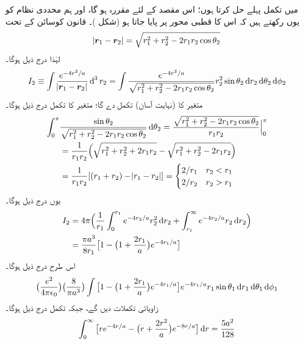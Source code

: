 میں  تکمل پہلے حل کرتا ہوں؛ اس مقصد کے لئے  مقررہ ہو گا، اور ہم  محددی نظام کو یوں رکھتے ہیں کہ اس کا قطبی محور  پر پایا جاتا ہو (شکل )۔ قانون کوسائن کے تحت 
\begin{align}
\abs{{{\boldsymbol{r}}}_{1}-{{\boldsymbol{r}}}_{2}}=\sqrt{r_{1}^{2}+r_{2}^{2}-2r_{1}r_{2}\cos{\theta_{2}}} 
\end{align}
 لہٰذا درج ذیل ہوگا۔
\begin{align}
I_{2}\equiv\int\frac{e^{-4r^{2}/a}}{\abs{\kvec{r}_{1}-\kvec{r}_{2}}}\dif^{\,3}r_{2}=\int\frac{e^{-4r^{2}/a}}{\sqrt{r_{1}^{2}+r_{2}^{2}-2r_{1}r_{2}\cos{\theta_{2}}}}r_{2}^{2}\sin{\theta_{2}}\dif r_{2}\dif \theta_{2}\dif \phi_{2} 
\end{align}
 متغیر  کا (نہایت آسان) تکمل  دے گا؛ متغیر  کا تکمل درج ذیل ہوگا۔
\begin{align}
 \int_{0}^{\pi}&\frac{\sin{\theta_{2}}}{\sqrt{r_{1}^{2}+r_{2}^{2}-2r_{1}r_{2}\cos{\theta_{2}}}}\dif{\theta_{2}}=\frac{\sqrt{r_{1}^{2}+r_{2}^{2}-2r_{1}r_{2}\cos{\theta_{2}}}}{r_{1}r_{2}}\Big\vert_{0}^{\pi}\nonumber\\
 &=\frac{1}{r_{1}r_{2}}\Big(\sqrt{r_{1}^{2}+r_{2}^{2}+2r_{1}r_{2}}-\sqrt{r_{1}^{2}+r_{2}^{2}-2r_{1}r_{2}}\Big)\nonumber\\
&=\frac{1}{r_{1}r_{2}}[(r_{1}+r_{2})-\abs{r_{1}-r_{2}}]=\begin{cases} 2/r_{1} & r_{2}<r_{1}\\
2/r_{2}&r_{2}>r_{1}
\end{cases}
\end{align}
 یوں درج ذیل ہوگا۔
\begin{align} 
I_{2}&=4\pi\Big (\frac{1}{r_{1}}\int_{0}^{r_{1}}e^{-4r_{2}/a}r_{2}^{2}\dif r_{2}+\int_{r_{1}}^{\infty}e^{-4r_{2}/a}r_{2}\dif r_{2}\Big)\nonumber\\
&=\frac{\pi a^{3}}{8r_{1}}\big[1-\big(1+\frac{2r_{1}}{a}\big)e^{-4r_{1}/a}\big]
\end{align}
 اس طرح  درج ذیل ہوگا۔
\begin{align*}
\big(\frac{e^{2}}{4\pi\epsilon_{0}}\big)\big(\frac{8}{\pi a^{3}}\big )\int\big [1-\big (1+\frac{2r_{1}}{a}\big )e^{-4r_{1}/a}\big ]e^{-4r_{1}/a}r_{1}\sin{\theta_{1}}\dif r_{1}\dif \theta_{1}\dif \phi_{1} 
\end{align*}
 زاویائی تکملات  دیں گے، جبکہ  تکمل درج ذیل ہوگا۔
\begin{align*}
\int_{0}^{\infty}\big [re^{-4r/a}-\big (r+\frac{2r^{2}}{a}\big )e^{-8r/a}\big ]\dif r=\frac{5a^{2}}{128} 
\end{align*}
